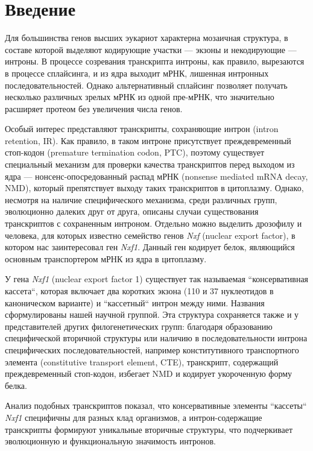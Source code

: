 \clearpage
\section{Введение}

Для большинства генов высших эукариот характерна мозаичная структура, в составе которой выделяют кодирующие участки — экзоны и некодирующие — интроны.
В процессе созревания транскрипта интроны, как правило, вырезаются в процессе сплайсинга, и из ядра выходит мРНК, лишенная интронных последовательностей.
Однако альтернативный сплайсинг позволяет получать несколько различных зрелых мРНК из одной пре-мРНК, что значительно расширяет протеом без увеличения числа генов.

Особый интерес представляют транскрипты, сохраняющие интрон (intron retention, IR).
Как правило, в таком интроне присутствует преждевременный стоп-кодон (premature termination codon, PTC), поэтому существует специальный механизм для проверки качества транскриптов перед выходом из ядра — нонсенс-опосредованный распад мРНК (nonsense mediated mRNA decay, NMD), который препятствует выходу таких транскриптов в цитоплазму.
Однако, несмотря на наличие специфического механизма, среди различных групп, эволюционно далеких друг от друга, описаны случаи существования транскриптов с сохраненным интроном.
Отдельно можно выделить дрозофилу и человека, для которых известно семейство генов \textit{Nxf} (nuclear export factor), в котором нас заинтересовал ген \textit{Nxf1}.
Данный ген кодирует белок, являющийся основным транспортером мРНК из ядра в цитоплазму.

У гена \textit{Nxf1} (nuclear export factor 1) существует так называемая ``консервативная кассета``, которая включает два коротких экзона (110 и 37 нуклеотидов в каноническом варианте) и ``кассетный`` интрон между ними.
Названия сформулированы нашей научной группой.
Эта структура сохраняется также и у представителей других филогенетических групп: благодаря образованию специфической вторичной структуры или наличию в последовательности интрона специфических последовательностей, например конститутивного транспортного элемента (constitutive transport element, CTE), транскрипт, содержащий преждевременный стоп-кодон, избегает NMD и кодирует укороченную форму белка.

Анализ подобных транскриптов показал, что консервативные элементы ``кассеты`` \textit{Nxf1} специфичны для разных клад организмов, а интрон-содержащие транскрипты формируют уникальные вторичные структуры, что подчеркивает эволюционную и функциональную значимость интронов.

